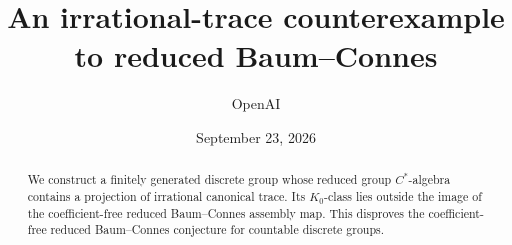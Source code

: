 \documentclass[11pt]{article}
\title{An irrational-trace counterexample to reduced Baum--Connes}
\author{OpenAI}
\date{September 23, 2026}
\begin{document}
\maketitle
\begin{abstract}
We construct a finitely generated discrete group whose reduced group
\(C^*\)-algebra contains a projection of irrational canonical trace. Its
\(K_0\)-class lies outside the image of the coefficient-free reduced
Baum--Connes assembly map. This disproves the coefficient-free reduced
Baum--Connes conjecture for countable discrete groups.
\end{abstract}
\setcounter{tocdepth}{1}
\tableofcontents






\begingroup
\small
\setlength{\parskip}{0pt}


\endgroup
\end{document}
